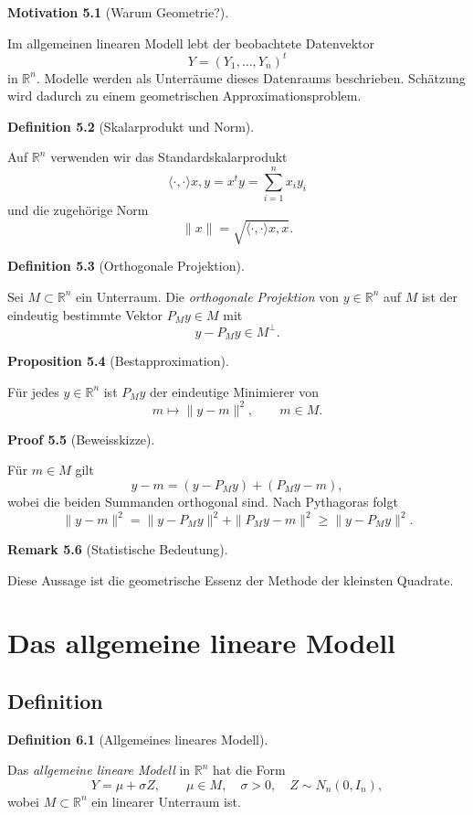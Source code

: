 \documentclass[10pt, letterpaper]{article}
\newcommand{\SKP}{\langle\cdot,\cdot\rangle}
\newcommand{\R}{\mathbb{R}}
\newcommand{\CustomHeading}[3]{%
  \par\medskip\noindent%
  \textbf{#1 #2} \textnormal{(#3)}.\enskip%
}
\newenvironment{DEF}[2]{\CustomHeading{Definition}{#1}{#2}}{}
\newenvironment{PROP}[2]{\CustomHeading{Proposition}{#1}{#2}}{}
\newenvironment{REM}[2]{\CustomHeading{Remark}{#1}{#2}}{}
\newenvironment{MOT}[2]{\CustomHeading{Motivation}{#1}{#2}}{}
\newenvironment{PROOF}[2]{\CustomHeading{Proof}{#1}{#2}}{}
\begin{document}
\begin{MOT}{5.1}{Warum Geometrie?}
Im allgemeinen linearen Modell lebt der beobachtete Datenvektor
\[
Y=(Y_1,\dots,Y_n)^t
\]
in \(\R^n\). Modelle werden als Unterräume dieses Datenraums beschrieben. Schätzung wird dadurch zu einem geometrischen Approximationsproblem.
\end{MOT}

\begin{DEF}{5.2}{Skalarprodukt und Norm}
Auf \(\R^n\) verwenden wir das Standardskalarprodukt
\[
\SKP{x,y}=x^t y=\sum_{i=1}^n x_i y_i
\]
und die zugehörige Norm
\[
\|x\|=\sqrt{\SKP{x,x}}.
\]
\end{DEF}

\begin{DEF}{5.3}{Orthogonale Projektion}
Sei \(M\subset \R^n\) ein Unterraum. Die \emph{orthogonale Projektion} von \(y\in\R^n\) auf \(M\) ist der eindeutig bestimmte Vektor \(P_M y\in M\) mit
\[
y-P_M y \in M^\perp.
\]
\end{DEF}

\begin{PROP}{5.4}{Bestapproximation}
Für jedes \(y\in\R^n\) ist \(P_My\) der eindeutige Minimierer von
\[
m\mapsto \|y-m\|^2,\qquad m\in M.
\]
\end{PROP}

\begin{PROOF}{5.5}{Beweisskizze}
Für \(m\in M\) gilt
\[
y-m=(y-P_My)+(P_My-m),
\]
wobei die beiden Summanden orthogonal sind. Nach Pythagoras folgt
\[
\|y-m\|^2=\|y-P_My\|^2+\|P_My-m\|^2 \ge \|y-P_My\|^2.
\]
\end{PROOF}

\begin{REM}{5.6}{Statistische Bedeutung}
Diese Aussage ist die geometrische Essenz der Methode der kleinsten Quadrate.
\end{REM}

\section{Das allgemeine lineare Modell}

\subsection{Definition}

\begin{DEF}{6.1}{Allgemeines lineares Modell}
Das \emph{allgemeine lineare Modell} in \(\R^n\) hat die Form
\[
Y=\mu+\sigma Z,
\qquad
\mu\in M,\quad \sigma>0,\quad Z\sim N_n(0,I_n),
\]
wobei \(M\subset\R^n\) ein linearer Unterraum ist.
\end{DEF}
\end{document}

